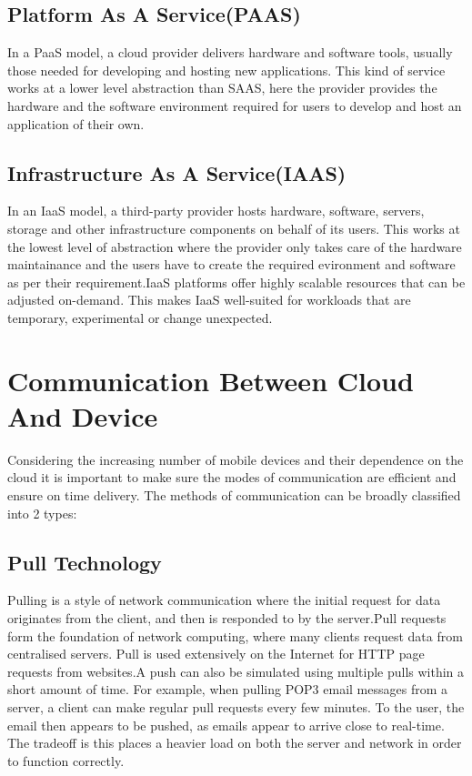 \subsection{Platform As A Service(PAAS)}
In a PaaS model, a cloud provider delivers hardware and software tools, usually those needed for developing and hosting new applications. This kind of service works at a lower level abstraction than SAAS, here the provider provides the hardware and the software environment required for users to develop and host an application of their own.

\subsection{Infrastructure As A Service(IAAS)}
In an IaaS model, a third-party provider hosts hardware, software, servers, storage and other infrastructure components on behalf of its users. This works at the lowest level of abstraction where the provider only takes care of the hardware maintainance and the users have to create the required evironment and software as per their requirement.IaaS platforms offer highly scalable resources that can be adjusted on-demand. This makes IaaS well-suited for workloads that are temporary, experimental or change unexpected.

\section{Communication Between Cloud And Device}
Considering the increasing number of mobile devices and their dependence on the cloud it is important to make sure the modes of communication are efficient and ensure on time delivery. The methods of communication can be broadly classified into 2 types:
\subsection{Pull Technology}
Pulling is a style of network communication where the initial request for data originates from the client, and then is responded to by the server.Pull requests form the foundation of network computing, where many clients request data from centralised servers. Pull is used extensively on the Internet for HTTP page requests from websites.A push can also be simulated using multiple pulls within a short amount of time. For example, when pulling POP3 email messages from a server, a client can make regular pull requests every few minutes. To the user, the email then appears to be pushed, as emails appear to arrive close to real-time. The tradeoff is this places a heavier load on both the server and network in order to function correctly. 
